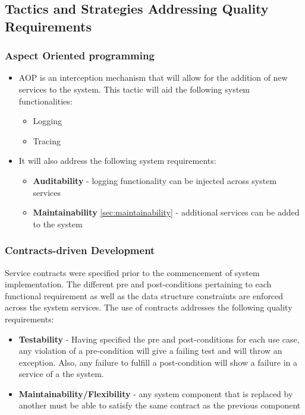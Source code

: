 \subsection{Tactics and Strategies Addressing Quality Requirements}
\subsubsection{Aspect Oriented programming}
\begin{itemize}
		\item AOP is an interception mechanism that will allow for the addition of new services to the system.
This tactic will aid the following system functionalities:
		\begin{itemize}
			\item Logging
		    \item Tracing
		\end{itemize}
\end{itemize}

\begin{itemize}
\item It will also address the following system requirements:
	\begin{itemize}
			\item \textbf{Auditability} - logging functionality can be injected across system services
			\item \textbf{Maintainability} \ref{sec:maintainability} - additional services can be added to the system
		\end{itemize}
\end{itemize}

\subsubsection{Contracts-driven Development}
Service contracts were specified prior to the commencement of system implementation. The different pre and post-conditions pertaining to each functional requirement as well as the data structure constraints are enforced across the system services. The use of contracts addresses the following quality requirements:
	\begin{itemize}
		\item \textbf{Testability} - Having specified the pre and post-conditions for each use case, any violation of a pre-condition will give a failing test and will throw an exception. Also, any failure to fulfill a post-condition will show a failure in a service of a the system.
		\item \textbf{Maintainability/Flexibility} - any system component that is replaced by another must be able to satisfy the same contract as the previous component
	\end{itemize}	


